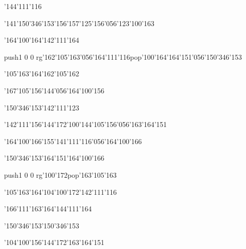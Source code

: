 \null\vfill\ipa\centerline{\enskip\char'144\char'111\char'116\enskip\enskip\enskip\enskip\enskip\enskip\enskip}\medskip\centerline{\enskip\enskip\enskip\enskip\char'141\enskip\enskip\enskip\enskip\char'150\char'346\char'153\enskip\char'156\char'157\char'125\char'156\char'056\char'123\char'100\char'163}\medskip\centerline{\enskip\char'164\char'100\char'164\enskip\enskip\enskip\enskip\enskip\enskip\enskip\enskip\enskip\enskip\char'142\char'111\char'164}\medskip\centerline{\enskip\pdfcolorstack\match push{1 0 0 rg}\char'162\char'105\char'163\char'056\char'164\char'111\char'116\pdfcolorstack\match pop{}\enskip\char'100\char'164\enskip\char'164\char'151\char'056\char'150\char'346\char'153}\medskip\centerline{\enskip\char'105\char'163\char'164\enskip\enskip\enskip\enskip\enskip\enskip\enskip\char'162\char'105\char'162}\medskip\centerline{\enskip\enskip\enskip\enskip\enskip\char'167\char'105\char'156\char'144\char'056\char'164\char'100\char'156\enskip\enskip\enskip\enskip}\medskip\centerline{\enskip\enskip\enskip\enskip\enskip\enskip\enskip\char'150\char'346\char'153\enskip\char'142\char'111\char'123}\medskip\centerline{\enskip\enskip\enskip\enskip\enskip\char'142\char'111\char'156\char'144\char'172\enskip\char'100\char'144\enskip\char'105\char'156\char'056\char'163\char'164\char'151}\medskip\vfill\footline{\hfil\tt\folio\hfil}\eject
\null\vfill\ipa\centerline{\enskip\enskip\enskip\enskip\enskip\enskip\enskip\enskip\enskip\enskip}\medskip\centerline{\enskip\enskip\enskip\enskip\enskip\enskip\enskip\enskip\enskip\char'164\char'100\char'166\enskip\char'155\char'141\char'111\char'116\char'056\char'164\char'100\char'166}\medskip\centerline{\enskip\char'150\char'346\char'153\enskip\enskip\enskip\enskip\char'164\char'151\enskip\enskip\enskip\enskip\char'164\char'100\char'166}\medskip\centerline{\enskip\enskip\enskip\enskip\enskip\enskip\enskip\enskip\pdfcolorstack\match push{1 0 0 rg}\char'100\char'172\pdfcolorstack\match pop{}\enskip\enskip\enskip\char'163\char'105\char'163}\medskip\centerline{\enskip\char'105\char'163\char'164\enskip\enskip\enskip\char'104\char'100\char'172\enskip\char'142\char'111\char'116}\medskip\centerline{\enskip\enskip\enskip\enskip\enskip\char'166\char'111\char'163\char'164\enskip\enskip\enskip\enskip\char'144\char'111\char'164}\medskip\centerline{\enskip\enskip\enskip\enskip\enskip\enskip\enskip\char'150\char'346\char'153\enskip\char'150\char'346\char'153}\medskip\centerline{\enskip\enskip\enskip\enskip\enskip\char'104\char'100\char'156\char'144\char'172\enskip\enskip\enskip\enskip\enskip\enskip\char'163\char'164\char'151}\medskip\vfill\footline{\hfil\tt\folio\hfil}\eject
